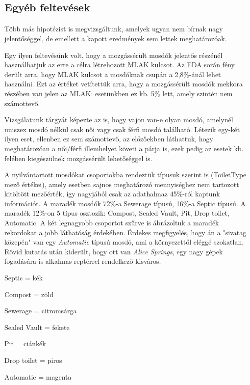 	\subsection{Egyéb feltevések}
	\paragraph{}
	Több más hipotézist is megvizsgáltunk, amelyek ugyan nem bírnak nagy jelentőséggel, de emellett a kapott eredmények sem lettek meghatározóak.\par
	Egy ilyen feltevésünk volt, hogy a mozgássérült mosdók jelentős részénél használhatjuk az erre a célra létrehozott MLAK kulcsot. Az EDA során fény derült arra, hogy MLAK kulcsot a mosdóknak csupán a 2,8\%-ánál lehet használni. Ezt az értéket vetítettük arra, hogy a mozgássérült mosdók mekkora részében van jelen az MLAK: esetünkben ez kb. 5\% lett, amely szintén nem számottevő.\par
	Vizsgálatunk tárgyát képezte az is, hogy vajon van-e olyan mosdó, amelynél uniszex mosdó nélkül csak női vagy csak férfi mosdó található. Létezik egy-két ilyen eset, ellenben ez sem számottevő, az előzőekben láthattuk, hogy meghatározóan a női/férfi illemhelyet követi a párja is, ezek pedig az esetek kb. felében kiegészülnek mozgássérült lehetőséggel is.\par
	A nyilvántartott mosdókat csoportokba rendeztük típusuk szerint is (ToiletType mező értékei), amely esetben sajnos meghatározó mennyiséghez nem tartozott kitöltött mezőérték, így nagyjából csak az adathalmaz 45\%-ról kaptunk információt. A maradék mosdók 72\%-a Sewerage típusú, 16\%-a Septic típusú. A maradék 12\%-on 5 típus osztozik: Compost, Sealed Vault, Pit, Drop toilet, Automatic. A két legnagyobb csoportot  szűrve is ábrázoltuk a maradék rekordokat a jobb láthatóság érdekében. Érdekes megfigyelés, hogy án a "sivatag közepén" van egy \textit{Automatic} típusú mosdó, ami a környezettől eléggé szokatlan. Rövid kutatás után kiderült, hogy ott van \textit{Alice Springs}, egy nagy gépek fogadására is alkalmas reptérrel rendelkező kisváros.
	\begin{compactlist}
		\item Septic = kék
		\item Compost = zöld
		\item Sewerage = citromsárga
		\item Sealed Vault = fekete
		\item Pit = ciánkék
		\item Drop toilet = piros
		\item Automatic = magenta
	\end{compactlist}\par

